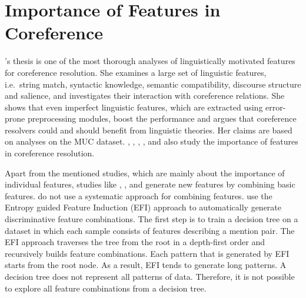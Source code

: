\section{Importance of Features in Coreference}
\label{ch:improvements:related}
{}'s thesis is one of the most thorough analyses of linguistically motivated features for coreference resolution.
She examines a large set of linguistic features, 
i.e.\ string match, syntactic knowledge, semantic compatibility, discourse structure and salience, 
and investigates their interaction with coreference relations.
She shows that even imperfect linguistic features, which are extracted using error-prone preprocessing modules, 
boost the performance
and argues that coreference resolvers could and should benefit from linguistic theories.
Her claims are based on analyses on the MUC dataset.
, , , , and  also study the importance of features in coreference resolution.

Apart from the mentioned studies, which are mainly about the importance of individual features,
studies like , , and  generate new features by combining basic features.
{} do not use a systematic approach for combining features.
{} use the Entropy guided Feature Induction (EFI) approach \cite{fernandes12entropy}
to automatically generate discriminative feature combinations.
The first step is to train a decision tree on a dataset in which
each sample consists of features describing a mention pair. 
The EFI approach traverses the tree from the root in a depth-first order 
and recursively builds feature combinations. 
Each pattern that is generated by EFI starts from the root node.
As a result, EFI tends to generate long patterns.
A decision tree does not represent all patterns of data.
Therefore, it is not possible to explore all feature combinations from a decision tree.

